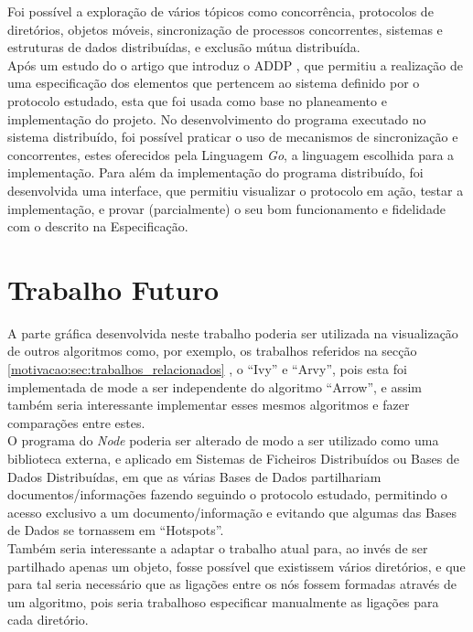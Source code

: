 Foi possível a exploração de vários tópicos como concorrência, protocolos de diretórios, objetos móveis, sincronização de processos concorrentes,
sistemas e estruturas de dados distribuídas, e exclusão mútua distribuída. \\

Após um estudo do o artigo que introduz o \acs{ADDP} \cite{Arrow}, que permitiu a realização de uma especificação dos elementos que pertencem ao sistema definido por o protocolo estudado,
esta que foi usada como base no planeamento e implementação do projeto.
No desenvolvimento do programa executado no sistema distribuído, foi possível praticar o uso de mecanismos de sincronização e concorrentes, estes oferecidos pela Linguagem \emph{Go},
a linguagem escolhida para a implementação.
Para além da implementação do programa distribuído, foi desenvolvida uma interface, que permitiu visualizar o protocolo em ação, testar a implementação, e provar (parcialmente) o seu
bom funcionamento e fidelidade com o descrito na Especificação.




\section{Trabalho Futuro}
\label{sec:trab-futuro}
A parte gráfica desenvolvida neste trabalho poderia ser utilizada na visualização de outros algoritmos como,
por exemplo, os trabalhos referidos na secção \ref{motivacao:sec:trabalhos_relacionados}
, o ``Ivy'' e ``Arvy'', pois esta foi implementada de mode a ser independente do algoritmo ``Arrow'',
e assim também seria interessante implementar esses mesmos algoritmos e fazer comparações entre estes. \\

\noindent O programa do \emph{Node} poderia ser alterado de modo a ser utilizado como uma biblioteca externa,
e aplicado em Sistemas de Ficheiros Distribuídos ou Bases de Dados Distribuídas,
em que as várias Bases de Dados partilhariam documentos/informações fazendo seguindo o protocolo estudado,
permitindo o acesso exclusivo a um documento/informação e evitando que algumas das Bases de Dados se tornassem em ``Hotspots''. \\

\noindent Também seria interessante a adaptar o trabalho atual para, ao invés de ser partilhado apenas um objeto, fosse possível que existissem vários diretórios, 
e que para tal seria necessário que as ligações entre os nós fossem formadas através de um algoritmo,
pois seria trabalhoso especificar manualmente as ligações para cada diretório. \\


